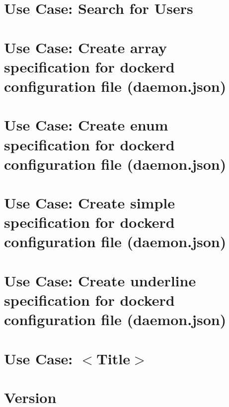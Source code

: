 \let\mypdfximage\pdfximage\def\pdfximage{\immediate\mypdfximage}\documentclass[twoside]{book}
\newcommand{\+}{\discretionary{\mbox{\scriptsize$\hookleftarrow$}}{}{}}
\begin{document}
\chapter{Use Case\+: Search for Users}
\label{doc_usecases_snippet_sharing_UC_search_user_md}

\chapter{Use Case\+: Create array specification for dockerd configuration file (daemon.\+json)}
\label{doc_usecases_specification_array-specification_md}

\chapter{Use Case\+: Create enum specification for dockerd configuration file (daemon.\+json)}
\label{doc_usecases_specification_enum-specification_md}

\chapter{Use Case\+: Create simple specification for dockerd configuration file (daemon.\+json)}
\label{doc_usecases_specification_simple-specification_md}

\chapter{Use Case\+: Create underline specification for dockerd configuration file (daemon.\+json)}
\label{doc_usecases_specification_underline-specification_md}

\chapter{Use Case\+: $<$Title$>$}
\label{doc_usecases_template_md}

\chapter{Version}
\label{doc_VERSION_md}

\end{document}
